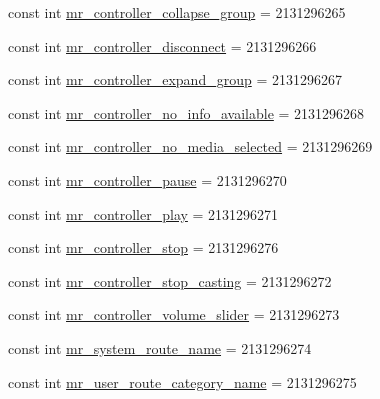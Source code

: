 \begin{DoxyCompactItemize}
\item 
const int \mbox{\hyperlink{class_f_w_p_s___app_1_1_droid_1_1_resource_1_1_string_a2df8fbf03924a94a4b82cdf603b45917}{mr\+\_\+controller\+\_\+collapse\+\_\+group}} = 2131296265
\item 
const int \mbox{\hyperlink{class_f_w_p_s___app_1_1_droid_1_1_resource_1_1_string_a3153ae356768ee979db8b0639f605083}{mr\+\_\+controller\+\_\+disconnect}} = 2131296266
\item 
const int \mbox{\hyperlink{class_f_w_p_s___app_1_1_droid_1_1_resource_1_1_string_ac9e6668e46804ad2d95044140ef9f593}{mr\+\_\+controller\+\_\+expand\+\_\+group}} = 2131296267
\item 
const int \mbox{\hyperlink{class_f_w_p_s___app_1_1_droid_1_1_resource_1_1_string_a84659897bfda38edf7768ad0182eb363}{mr\+\_\+controller\+\_\+no\+\_\+info\+\_\+available}} = 2131296268
\item 
const int \mbox{\hyperlink{class_f_w_p_s___app_1_1_droid_1_1_resource_1_1_string_a5d767c09ef455b360f2dae6a18a154f3}{mr\+\_\+controller\+\_\+no\+\_\+media\+\_\+selected}} = 2131296269
\item 
const int \mbox{\hyperlink{class_f_w_p_s___app_1_1_droid_1_1_resource_1_1_string_ade1b3020fb4a6ecc780d038e3cd4b1d8}{mr\+\_\+controller\+\_\+pause}} = 2131296270
\item 
const int \mbox{\hyperlink{class_f_w_p_s___app_1_1_droid_1_1_resource_1_1_string_a0bb1586c7ba98c981e5a435d3be495ca}{mr\+\_\+controller\+\_\+play}} = 2131296271
\item 
const int \mbox{\hyperlink{class_f_w_p_s___app_1_1_droid_1_1_resource_1_1_string_ac5ec5610c064305dba9b631444527460}{mr\+\_\+controller\+\_\+stop}} = 2131296276
\item 
const int \mbox{\hyperlink{class_f_w_p_s___app_1_1_droid_1_1_resource_1_1_string_aba57a6a7505b17ec168170b3c596a154}{mr\+\_\+controller\+\_\+stop\+\_\+casting}} = 2131296272
\item 
const int \mbox{\hyperlink{class_f_w_p_s___app_1_1_droid_1_1_resource_1_1_string_a0d3b39bb63397757c721812cf1978f6b}{mr\+\_\+controller\+\_\+volume\+\_\+slider}} = 2131296273
\item 
const int \mbox{\hyperlink{class_f_w_p_s___app_1_1_droid_1_1_resource_1_1_string_a6ecdcd2de2e40f0ceb4dec2dab5fdb22}{mr\+\_\+system\+\_\+route\+\_\+name}} = 2131296274
\item 
const int \mbox{\hyperlink{class_f_w_p_s___app_1_1_droid_1_1_resource_1_1_string_ab944c5f41de481d2cf8bada5879f992f}{mr\+\_\+user\+\_\+route\+\_\+category\+\_\+name}} = 2131296275

\end{DoxyCompactItemize}
